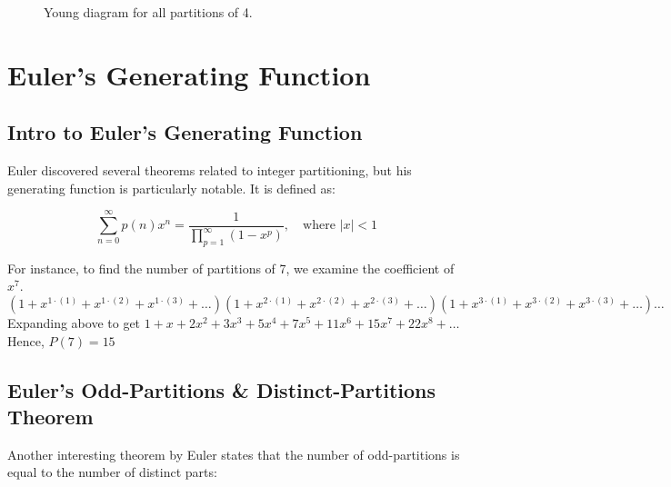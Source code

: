 \documentclass{article}
\theoremstyle{definition}
\theoremstyle{question}
\begin{document}
\begin{figure}[h]
\centering
{}
\caption{Young diagram for all partitions of 4.}
\end{figure}


\newpage
\section{Euler's Generating Function}

\subsection{Intro to Euler's Generating Function}
Euler discovered several theorems related to integer partitioning, but his generating function is particularly notable. It is defined as:

\[
\sum_{n=0}^{\infty} p(n) x^n = \frac{1}{\prod_{p=1}^{\infty} (1-x^p)}, \quad \text{where } |x| < 1
\]

\noindent For instance, to find the number of partitions of 7, we examine the coefficient of \(x^7\).
\[
(1 + x^{1\cdot(1)} + x^{1\cdot(2)} + x^{1\cdot(3)} + \ldots )(1 + x^{2\cdot(1)} + x^{2\cdot(2)} + x^{2\cdot(3)} + \ldots )(1 + x^{3\cdot(1)} + x^{3\cdot(2)} + x^{3\cdot(3)} + \ldots ) \ldots
\]
Expanding above to get \(1 + x + 2x^2 + 3x^3 + 5x^4 + 7x^5 + 11x^6 + 15x^7 + 22x^8 + \ldots\)
\newline
\newline
\noindent Hence, \(P(7)=15\)


\subsection{Euler's Odd-Partitions \& Distinct-Partitions Theorem}
Another interesting theorem by Euler states that the number of odd-partitions is equal to the number of distinct parts:\\
\end{document}
